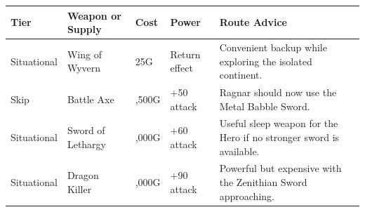 \documentclass[
  american,
  10pt,
  letterpaper,
  oneside,
  open=any]{scrreprt}
\newcounter{none} %
\newenvironment{guidetable}{%
  \small\setstretch{1.0}%
  \setlength{\tabcolsep}{4pt}%
  \setlength{\LTpre}{8pt}\setlength{\LTpost}{10pt}%
  \renewcommand{\arraystretch}{1.16}%
}{ }
\begin{document}
\begin{guidetable}

{\def\LTcaptype{none} %
\begin{longtable}[]{@{}
  >{\raggedright\arraybackslash}p{}
  >{\raggedright\arraybackslash}p{}
  >{\raggedleft\arraybackslash}p{}
  >{\raggedleft\arraybackslash}p{}
  >{\raggedright\arraybackslash}p{}@{}}
\toprule\noalign{}
\begin{minipage}[b]{\linewidth}\raggedright
\color{GuideGreen}\bfseries Tier
\end{minipage} & \begin{minipage}[b]{\linewidth}\raggedright
\color{GuideGreen}\bfseries Weapon or Supply
\end{minipage} & \begin{minipage}[b]{\linewidth}\raggedleft
\color{GuideGreen}\bfseries Cost
\end{minipage} & \begin{minipage}[b]{\linewidth}\raggedleft
\color{GuideGreen}\bfseries Power
\end{minipage} & \begin{minipage}[b]{\linewidth}\raggedright
\color{GuideGreen}\bfseries Route Advice
\end{minipage} \\
\midrule\noalign{}
\endhead
\bottomrule\noalign{}
\endlastfoot
Situational & Wing of Wyvern & 25G & Return effect & Convenient backup
while exploring the isolated continent. \\
Skip & Battle Axe & 5,500G & +50 attack & Ragnar should now use the
Metal Babble Sword. \\
Situational & Sword of Lethargy & 8,000G & +60 attack & Useful sleep
weapon for the Hero if no stronger sword is available. \\
Situational & Dragon Killer & 15,000G & +90 attack & Powerful but
expensive with the Zenithian Sword approaching. \\
\end{longtable}
}

\end{guidetable}
\end{document}
